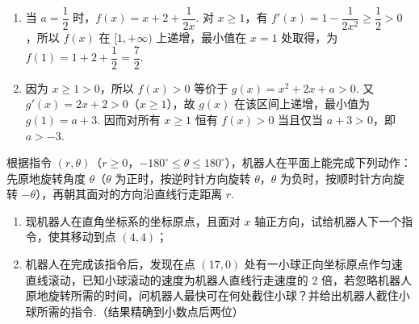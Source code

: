 \begin{solution}
\begin{enumerate}
\item 当 \(a=\dfrac{1}{2}\) 时，\(f(x)=x+2+\dfrac{1}{2x}\). 对 \(x\geqslant1\)，有 \(f'(x)=1-\dfrac{1}{2x^2}\geqslant\dfrac{1}{2}>0\)，所以 \(f(x)\) 在 \([1,+\infty)\) 上递增，最小值在 \(x=1\) 处取得，为 \(f(1)=1+2+\dfrac{1}{2}=\dfrac{7}{2}\).
\item 因为 \(x\geqslant1>0\)，所以 \(f(x)>0\) 等价于 \(g(x)=x^2+2x+a>0\). 又 \(g'(x)=2x+2>0\)（\(x\geqslant1\)），故 \(g(x)\) 在该区间上递增，最小值为 \(g(1)=a+3\). 因而对所有 \(x\geqslant1\) 恒有 \(f(x)>0\) 当且仅当 \(a+3>0\)，即 \(a>-3\).
\end{enumerate}
\end{solution}

\begin{problem}
根据指令 \((r,\theta)\)（\(r \geqslant 0\)，\(-180^{\circ} \leqslant \theta \leqslant 180^{\circ}\)），机器人在平面上能完成下列动作：先原地旋转角度 \(\theta\)（\(\theta\) 为正时，按逆时针方向旋转 \(\theta\)，\(\theta\) 为负时，按顺时针方向旋转 \(-\theta\)），再朝其面对的方向沿直线行走距离 \(r\).
\begin{enumerate}
\item 现机器人在直角坐标系的坐标原点，且面对 \(x\) 轴正方向，试给机器人下一个指令，使其移动到点 \((4,4)\)；
\item 机器人在完成该指令后，发现在点 \((17,0)\) 处有一小球正向坐标原点作匀速直线滚动，已知小球滚动的速度为机器人直线行走速度的 2 倍，若忽略机器人原地旋转所需的时间，问机器人最快可在何处截住小球？并给出机器人截住小球所需的指令.（结果精确到小数点后两位）
\end{enumerate}

\end{problem}

